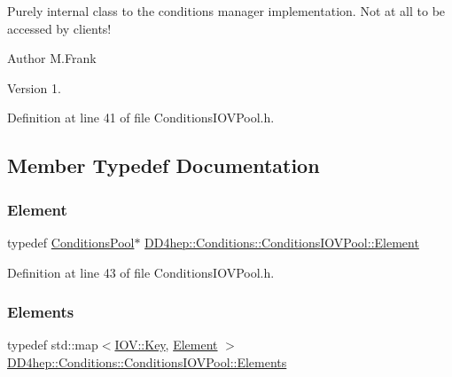 Purely internal class to the conditions manager implementation. Not at all to be accessed by clients!

\begin{DoxyAuthor}{Author}
M.\+Frank 
\end{DoxyAuthor}
\begin{DoxyVersion}{Version}
1. 
\end{DoxyVersion}


Definition at line 41 of file Conditions\+I\+O\+V\+Pool.\+h.



\subsection{Member Typedef Documentation}
\hypertarget{class_d_d4hep_1_1_conditions_1_1_conditions_i_o_v_pool_a41146867e220b8f23ef69afe5f724914}{}\label{class_d_d4hep_1_1_conditions_1_1_conditions_i_o_v_pool_a41146867e220b8f23ef69afe5f724914} 
\subsubsection{\texorpdfstring{Element}{Element}}
{\footnotesize\ttfamily typedef \hyperlink{class_d_d4hep_1_1_conditions_1_1_conditions_pool}{Conditions\+Pool}$\ast$ \hyperlink{class_d_d4hep_1_1_conditions_1_1_conditions_i_o_v_pool_a41146867e220b8f23ef69afe5f724914}{D\+D4hep\+::\+Conditions\+::\+Conditions\+I\+O\+V\+Pool\+::\+Element}}



Definition at line 43 of file Conditions\+I\+O\+V\+Pool.\+h.

\hypertarget{class_d_d4hep_1_1_conditions_1_1_conditions_i_o_v_pool_aa011c5cc19bfb761be62adf9a88b5ee9}{}\label{class_d_d4hep_1_1_conditions_1_1_conditions_i_o_v_pool_aa011c5cc19bfb761be62adf9a88b5ee9} 
\subsubsection{\texorpdfstring{Elements}{Elements}}
{\footnotesize\ttfamily typedef std\+::map$<$\hyperlink{class_d_d4hep_1_1_i_o_v_a07cb46dc875296dc9cccf4ff370104ae}{I\+O\+V\+::\+Key}, \hyperlink{class_d_d4hep_1_1_conditions_1_1_conditions_i_o_v_pool_a41146867e220b8f23ef69afe5f724914}{Element} $>$ \hyperlink{class_d_d4hep_1_1_conditions_1_1_conditions_i_o_v_pool_aa011c5cc19bfb761be62adf9a88b5ee9}{D\+D4hep\+::\+Conditions\+::\+Conditions\+I\+O\+V\+Pool\+::\+Elements}}



